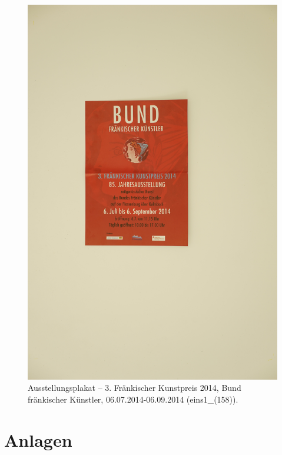 \documentclass[a4paper,12pt,ngerman]{article}
\begin{document}
\newpage
\begin{figure}[H]
\includegraphics[width=\linewidth]{Abbildung_78_(eins1_(156))}
\centering
\caption{Ausstellungsplakat -- 3. Fränkischer Kunstpreis 2014, Bund fränkischer Künstler, 06.07.2014-06.09.2014 (eins1\_(158)).}
\end{figure}


\newpage
\section{Anlagen}
\end{document}

